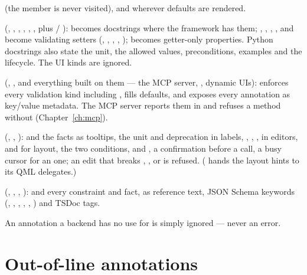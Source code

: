 \begin{description}[leftmargin=0cm,style=nextline,font=\normalfont\itshape]
  \item[Every backend]  (the member is never visited), and
     wherever defaults are rendered.
  \item[Scripting backends] (, , ,
    , , , plus  / ):
     becomes docstrings where the framework has them; ,
    , , ,  and 
    become validating setters (, , ,
    , );  becomes getter-only properties.
    Python docstrings also state the unit, the allowed values, preconditions,
    examples and the lifecycle. The UI kinds are ignored.
  \item[The dynamic core] (, , and everything built
    on them --- the MCP server, , dynamic UIs): enforces
    every validation kind including , fills defaults, and
    exposes every annotation as key/value metadata. The MCP server reports them
    in  and refuses a  method without
     (Chapter~\ref{ch:mcp}).
  \item[UI inspectors] (, , ):  and
    the facts as tooltips, the unit and deprecation in labels, ,
    , ,  in editors,  and
     for layout, the two conditions,  and
    , a confirmation before a  call, a busy
    cursor for an  one; an edit that breaks ,
    ,  or  is refused. ( hands the
    layout hints to its QML delegates.)
  \item[Document backends] (, , ,
    ):  and every constraint and fact, as reference
    text, JSON Schema keywords (, ,
    , , , ) and
    TSDoc tags.
\end{description}

An annotation a backend has no use for is simply ignored --- never an error.

\section{Out-of-line annotations}
\label{sec:outofline}


